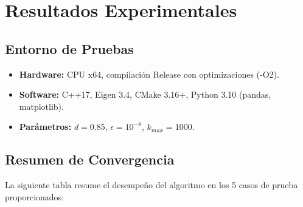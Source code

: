\documentclass[12pt,a4paper]{article}
\theoremstyle{definition}
\begin{document}
\section{Resultados Experimentales}\label{sec:resultados}

\subsection{Entorno de Pruebas}
\begin{itemize}
    \item \textbf{Hardware:} CPU x64, compilaci\'{o}n Release con optimizaciones (-O2).
    \item \textbf{Software:} C++17, Eigen 3.4, CMake 3.16+, Python 3.10 (pandas, matplotlib).
    \item \textbf{Par\'{a}metros:} $d = 0.85$, $\epsilon = 10^{-8}$, $k_{max} = 1000$.
\end{itemize}

\subsection{Resumen de Convergencia}

La siguiente tabla resume el desempe\~{n}o del algoritmo en los 5 casos de prueba proporcionados:

\begin{table}[H]
\centering
\caption{M\'{e}tricas de convergencia del M\'{e}todo de las Potencias por caso.}
\label{tab:resumen}
\end{table}
\end{document}
